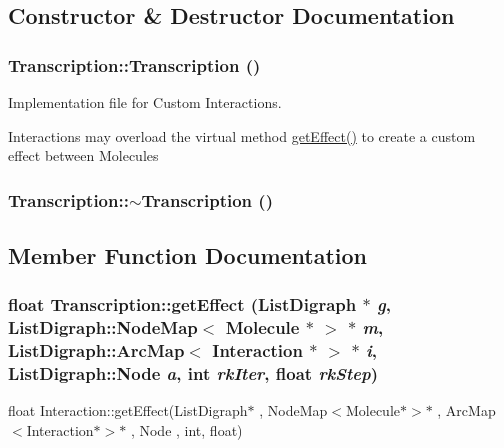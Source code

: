 \subsection{Constructor \& Destructor Documentation}
\hypertarget{classTranscription_a62de8bf657c60367b130dee116cb5dd5}{
\subsubsection[{Transcription}]{\setlength{\rightskip}{0pt plus 5cm}Transcription::Transcription ()}}
\label{classTranscription_a62de8bf657c60367b130dee116cb5dd5}
Implementation file for Custom Interactions.

Interactions may overload the virtual method \hyperlink{classTranscription_a73f9e09dac4b601a297fd4d59c92cea5}{getEffect()} to create a custom effect between Molecules \hypertarget{classTranscription_a51326fb001bf9d6dc18debd770ef0321}{
\subsubsection[{$\sim$Transcription}]{\setlength{\rightskip}{0pt plus 5cm}Transcription::$\sim$Transcription ()}}
\label{classTranscription_a51326fb001bf9d6dc18debd770ef0321}


\subsection{Member Function Documentation}
\hypertarget{classTranscription_a73f9e09dac4b601a297fd4d59c92cea5}{
\subsubsection[{getEffect}]{\setlength{\rightskip}{0pt plus 5cm}float Transcription::getEffect (ListDigraph $\ast$ {\em g}, \/  ListDigraph::NodeMap$<$ {\bf Molecule} $\ast$ $>$ $\ast$ {\em m}, \/  ListDigraph::ArcMap$<$ {\bf Interaction} $\ast$ $>$ $\ast$ {\em i}, \/  ListDigraph::Node {\em a}, \/  int {\em rkIter}, \/  float {\em rkStep})}}
\label{classTranscription_a73f9e09dac4b601a297fd4d59c92cea5}
float Interaction::getEffect(ListDigraph$\ast$ , NodeMap$<$Molecule$\ast$$>$$\ast$ , ArcMap$<$Interaction$\ast$$>$$\ast$ , Node , int, float)

